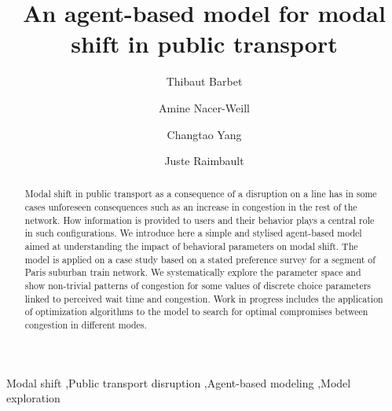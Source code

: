 \documentclass[3p,times,procedia]{elsarticle}
\begin{document}
\begin{frontmatter}


\title{An agent-based model for modal shift in public transport}

\author[a]{Thibaut Barbet}
\author[a]{Amine Nacer-Weill}
\author[a]{Changtao Yang}
\author[b]{Juste Raimbault}

\address[a]{Ecole des Ponts ParisTech, Champs-sur-Marne, France}
\address[b]{CASA, University College London, London, United Kingdom}

\begin{abstract}
Modal shift in public transport as a consequence of a disruption on a line has in some cases unforeseen consequences such as an increase in congestion in the rest of the network. How information is provided to users and their behavior plays a central role in such configurations. We introduce here a simple and stylised agent-based model aimed at understanding the impact of behavioral parameters on modal shift. The model is applied on a case study based on a stated preference survey for a segment of Paris suburban train network. We systematically explore the parameter space and show non-trivial patterns of congestion for some values of discrete choice parameters linked to perceived wait time and congestion. Work in progress includes the application of optimization algorithms to the model to search for optimal compromises between congestion in different modes.
\end{abstract}

\begin{keyword}
Modal shift \sep Public transport disruption \sep Agent-based modeling \sep Model exploration
\end{keyword}
\end{frontmatter}




\end{document}
